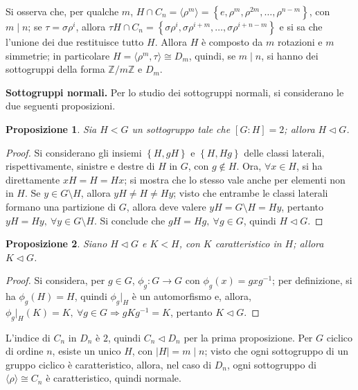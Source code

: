 \documentclass[11pt]{article}
\theoremstyle{style}
\newtheorem{prop}{Proposizione}[section]
\numberwithin{equation}{subsection}
\renewcommand{\textbf}[1]{\textsf{\bfseries #1}}
\begin{document}
\noindent Si osserva che, per qualche $m$, $H \cap C_n = \langle \rho ^m \rangle= \left\{ e ,\rho ^m , \rho ^{2m} ,\ldots,\rho ^{n - m}  \right\} $, con $m  \mid  n$; se $\tau  = \sigma  \rho ^i $, allora $\tau  H \cap C_n = \left\{ \sigma \rho ^i, \sigma \rho ^{i+m}, \ldots, \sigma \rho ^{i+n - m}   \right\}$ e si sa che l'unione dei due restituisce tutto $H$.
Allora $H$ \`e composto da $m$ rotazioni e $m$ simmetrie; in particolare $H = \langle \rho ^m , \tau  \rangle\cong D_m$, quindi, se $m  \mid  n$, si hanno dei sottogruppi della forma $\mathbb{Z} / m \mathbb{Z}$ e $D_m$.
\vspace{5pt}

\textbf{Sottogruppi normali.} Per lo studio dei sottogruppi normali, si considerano le due seguenti proposizioni.
\begin{prop}
	Sia $H<G$ un sottogruppo tale che $[G:H] = 2$; allora $H\lhd G$.
\end{prop}
	\begin{proof}
		Si considerano gli insiemi $\left\{ H,gH \right\} $ e $\left\{ H,Hg \right\} $ delle classi laterali, rispettivamente, sinistre e destre di $H$ in $G$, con $g\not\in H$.
		Ora, $\forall x \in H$, si ha direttamente $xH=H=Hx$; si mostra che lo stesso vale anche per elementi non in $H$.
		Se $y \in G \setminus H$, allora $yH\neq H \neq Hy$; visto che entrambe le classi laterali formano una partizione di $G$, allora deve valere $yH = G \setminus H = Hy$, pertanto $yH=Hy, \ \forall y \in G \setminus H$.
		Si conclude che $gH=Hg, \ \forall g \in G$, quindi $H\lhd G$.
	\end{proof}
\begin{prop}
	Siano $H \lhd G$ e $K < H$, con $K$ caratteristico in $H$; allora $K \lhd G$.
\end{prop} 
	\begin{proof}
		Si considera, per $g \in G$, $\phi _g : G\to G$ con $\phi_g(x) = gxg^{-1}$; per definizione, si ha $\phi _g (H) = H$, quindi $\phi_g|_{H} $ \`e un automorfismo e, allora, $\phi _g|_{H} (K) = K, \ \forall g \in G \Rightarrow gKg^{-1} = K$, pertanto $K \lhd G$.
	\end{proof}

\noindent L'indice di $C_n$ in $D_n$ \`e $2$, quindi $C_n \lhd D_n$ per la prima proposizione.
Per $G$ ciclico di ordine $n$, esiste un unico $H $, con $\lvert H \rvert =m  \mid n$; visto che ogni sottogruppo di un gruppo ciclico \`e caratteristico, allora, nel caso di $D_n$, ogni sottogruppo di $\langle \rho  \rangle\cong C_n$ \`e caratteristico, quindi normale.
\end{document}
